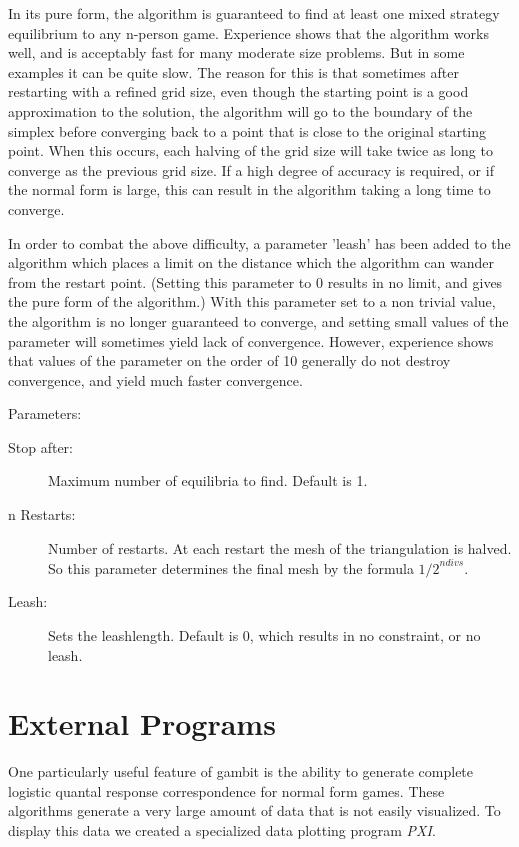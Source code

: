 In its pure form, the algorithm is guaranteed to find at least one
mixed strategy equilibrium to any n-person game.  Experience shows
that the algorithm works well, and is acceptably fast for many
moderate size problems.  But in some examples it can be quite slow.
The reason for this is that sometimes after restarting with a refined
grid size, even though the starting point is a good approximation to
the solution, the algorithm will go to the boundary of the simplex
before converging back to a point that is close to the original
starting point.  When this occurs, each halving of the grid size will
take twice as long to converge as the previous grid size.  If a high
degree of accuracy is required, or if the normal form is large, this
can result in the algorithm taking a long time to converge.

In order to combat the above difficulty, a parameter 'leash' has been
added to the algorithm which places a limit on the distance which the
algorithm can wander from the restart point. (Setting this parameter
to 0 results in no limit, and gives the pure form of the algorithm.)
With this parameter set to a non trivial value, the algorithm is no
longer guaranteed to converge, and setting small values of the
parameter will sometimes yield lack of convergence.  However,
experience shows that values of the parameter on the order of 10
generally do not destroy convergence, and yield much faster
convergence.

Parameters:

\begin{description}
\item[Stop after:] Maximum number of equilibria to find. Default is 1.  
\item[n Restarts:] Number of restarts.  At each restart the mesh of the
triangulation is halved.  So this parameter determines the final mesh
by the formula ${1/2}^{ndivs}$.
\item[Leash:] Sets the leashlength. Default is 0, which results in no
constraint, or no leash.  
\end{description}

\chapter{External Programs}
One particularly useful feature of gambit is the ability to generate complete 
logistic quantal response correspondence for normal form games.  These
algorithms generate a very large amount of data that is not easily visualized.
To display this data we created a specialized data plotting program {\em PXI}.


